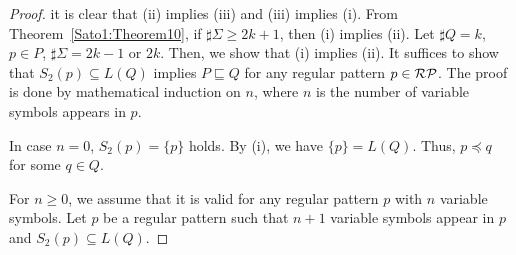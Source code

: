 \begin{proof}
    it is clear that (ii) implies (iii) and (iii) implies (i).
    From Theorem~\ref{Sato1:Theorem10}, %
    if $\sharp\Sigma \geq 2k+1$, then
    (i) implies (ii).
    Let $\sharp Q = k$, $p \in P$, $\sharp\Sigma = 2k-1$ or $2k$.
    Then, we show that (i) implies (ii).
    It suffices to show that $S_{2}(p) \subseteq L(Q)$ implies $P \sqsubseteq Q$
    for any regular pattern $p \in \mathcal{RP}$.
    The proof is done by mathematical induction on $n$, where $n$ is the number of variable symbols appears in $p$.


    In case $n=0$, $S_{2}(p) = \{p\}$ holds.
    By (i), we have $\{p\} = L(Q)$. Thus, $p \preceq q$ for some $q \in Q$.

    For $n \geq 0$,
    we assume that it is valid for any regular pattern $p$
    with $n$ variable symbols.
    Let $p$ be a regular pattern such that $n+1$ variable symbols appear in $p$
    and $S_{2}(p) \subseteq L(Q)$.


\end{proof}
